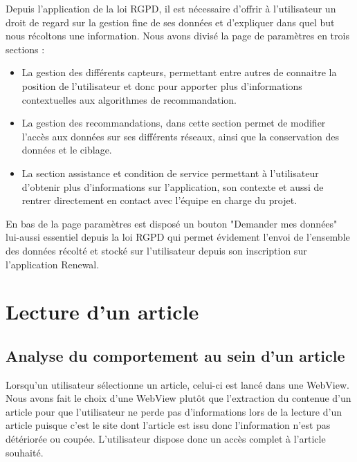 Depuis l'application de la loi RGPD, il est nécessaire d'offrir à l'utilisateur un droit de regard sur la gestion fine de ses données et d'expliquer dans quel but nous récoltons une information. Nous avons divisé la page de paramètres en trois sections :

\begin{itemize}
    \item La gestion des différents capteurs, permettant entre autres de connaitre la position de l’utilisateur et donc pour apporter plus d'informations contextuelles aux algorithmes de recommandation. 
     \item La gestion des recommandations, dans cette section permet de modifier l'accès aux données sur ses différents réseaux, ainsi que la conservation des données et le ciblage. 
    \item La section assistance et condition de service permettant à l'utilisateur d'obtenir plus d'informations sur l'application, son contexte et aussi de rentrer directement en contact avec l'équipe en charge du projet.

\end{itemize}




En bas de la page paramètres est disposé un bouton "Demander mes données" lui-aussi essentiel depuis la loi RGPD qui permet évidement l'envoi de l'ensemble des données récolté et stocké sur l'utilisateur depuis son inscription sur l'application Renewal. 

\section{Lecture d'un article}

\subsection{Analyse du comportement au sein d'un article}

Lorsqu'un utilisateur sélectionne un article, celui-ci est lancé dans une WebView. Nous avons fait le choix d'une WebView plutôt que l'extraction du contenue d'un article pour que l'utilisateur ne perde pas d'informations lors de la lecture d'un article puisque c'est le site dont l’article est issu donc l'information n'est pas détériorée ou coupée. L'utilisateur dispose donc un accès complet à l'article souhaité.

